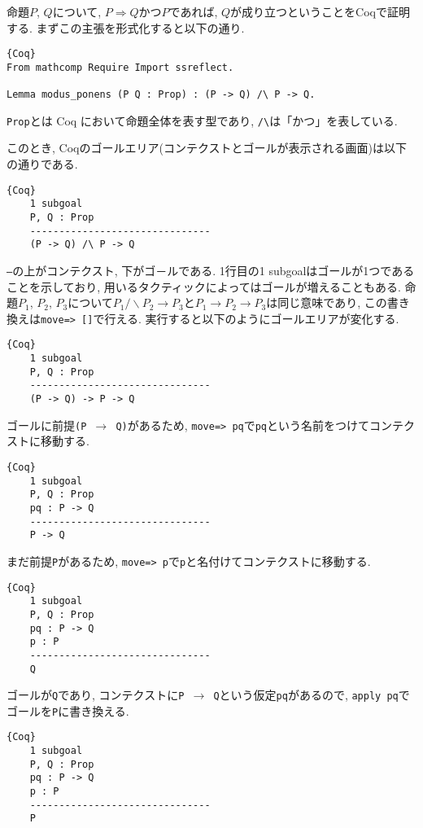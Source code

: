 \documentclass[11pt]{jsreport}
\theoremstyle{mystyle}
\newcommand{\Lra}{\Longrightarrow}
\newcommand{\0}{\textbf{0}}
\newcommand{\1}{\textbf{1}}
\newcommand{\2}{\textbf{2}}
\begin{document}
命題$P$, $Q$について, $P \Lra Q$かつ$P$であれば, $Q$が成り立つということをCoqで証明する. 
まずこの主張を形式化すると以下の通り. 
\begin{lstlisting}{Coq}
From mathcomp Require Import ssreflect.

Lemma modus_ponens (P Q : Prop) : (P -> Q) /\ P -> Q. \end{lstlisting}
{\tt Prop}とは Coq において命題全体を表す型であり, {\tt /\textbackslash}は「かつ」を表している. 

このとき, Coqのゴールエリア(コンテクストとゴールが表示される画面)は以下の通りである. 
\begin{screen}
  \begin{lstlisting}{Coq}
    1 subgoal
    P, Q : Prop
    -------------------------------
    (P -> Q) /\ P -> Q \end{lstlisting}
\end{screen}
{\tt ---}の上がコンテクスト, 下がゴ－ルである. 1行目の{1 subgoal}はゴールが1つであることを示しており, 用いるタクティックによってはゴールが増えることもある. 
命題$P_1$, $P_2$, $P_3$について$P_1 /\backslash P_2 \to P_3$と$P_1 \to P_2 \to P_3$は同じ意味であり, この書き換えは{\tt move=> []}で行える. 実行すると以下のようにゴールエリアが変化する. 
\begin{screen}
  \begin{lstlisting}{Coq}
    1 subgoal
    P, Q : Prop
    -------------------------------
    (P -> Q) -> P -> Q \end{lstlisting}
\end{screen}
ゴールに前提{\tt (P $\to$ Q)}があるため, {\tt move=> pq}で{\tt pq}という名前をつけてコンテクストに移動する. 
\begin{screen}
  \begin{lstlisting}{Coq}
    1 subgoal
    P, Q : Prop
    pq : P -> Q
    -------------------------------
    P -> Q \end{lstlisting}
\end{screen}
まだ前提{\tt P}があるため, {\tt move=> p}で{\tt p}と名付けてコンテクストに移動する. 
\begin{screen}
  \begin{lstlisting}{Coq}
    1 subgoal
    P, Q : Prop
    pq : P -> Q
    p : P
    -------------------------------
    Q \end{lstlisting}
\end{screen}
ゴールが{\tt Q}であり, コンテクストに{\tt P $\to$ Q}という仮定{\tt pq}があるので, {\tt apply pq}でゴールを{\tt P}に書き換える. 
\begin{screen}
  \begin{lstlisting}{Coq}
    1 subgoal
    P, Q : Prop
    pq : P -> Q
    p : P
    -------------------------------
    P \end{lstlisting}
\end{screen}
\end{document}
